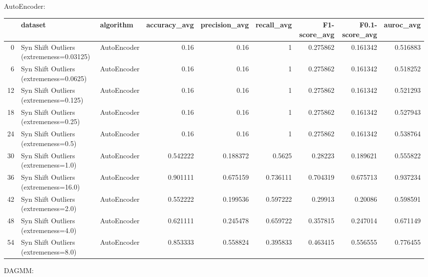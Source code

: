 AutoEncoder:

\begin{tabular}{rllrrrrrr}
\hline
    & dataset                                  & algorithm   &   accuracy\_avg &   precision\_avg &   recall\_avg &   F1-score\_avg &   F0.1-score\_avg &   auroc\_avg \\
\hline
  0 & Syn Shift Outliers (extremeness=0.03125) & AutoEncoder &       0.16     &        0.16     &     1        &       0.275862 &         0.161342 &    0.516883 \\
  6 & Syn Shift Outliers (extremeness=0.0625)  & AutoEncoder &       0.16     &        0.16     &     1        &       0.275862 &         0.161342 &    0.518252 \\
 12 & Syn Shift Outliers (extremeness=0.125)   & AutoEncoder &       0.16     &        0.16     &     1        &       0.275862 &         0.161342 &    0.521293 \\
 18 & Syn Shift Outliers (extremeness=0.25)    & AutoEncoder &       0.16     &        0.16     &     1        &       0.275862 &         0.161342 &    0.527943 \\
 24 & Syn Shift Outliers (extremeness=0.5)     & AutoEncoder &       0.16     &        0.16     &     1        &       0.275862 &         0.161342 &    0.538764 \\
 30 & Syn Shift Outliers (extremeness=1.0)     & AutoEncoder &       0.542222 &        0.188372 &     0.5625   &       0.28223  &         0.189621 &    0.555822 \\
 36 & Syn Shift Outliers (extremeness=16.0)    & AutoEncoder &       0.901111 &        0.675159 &     0.736111 &       0.704319 &         0.675713 &    0.937234 \\
 42 & Syn Shift Outliers (extremeness=2.0)     & AutoEncoder &       0.552222 &        0.199536 &     0.597222 &       0.29913  &         0.20086  &    0.598591 \\
 48 & Syn Shift Outliers (extremeness=4.0)     & AutoEncoder &       0.621111 &        0.245478 &     0.659722 &       0.357815 &         0.247014 &    0.671149 \\
 54 & Syn Shift Outliers (extremeness=8.0)     & AutoEncoder &       0.853333 &        0.558824 &     0.395833 &       0.463415 &         0.556555 &    0.776455 \\
\hline
\end{tabular}

DAGMM:

